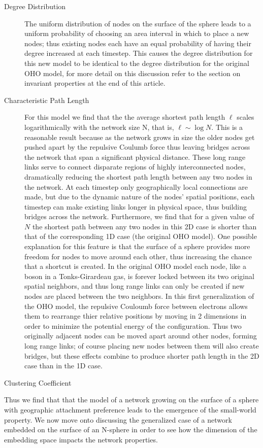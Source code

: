 \documentclass[aps,pre,reprint,superscriptaddress,amsmath,amssymb]{revtex4-1}
\begin{document}
\begin{description}
  \item[Degree Distribution] The uniform distribution of nodes on the surface of the sphere leads to a uniform probability of choosing an area interval in which to place a new nodes; thus existing nodes each have an equal probability of having their degree increased at each timestep.
This causes the degree distribution for this new model to be identical to the degree distribution for the original OHO model, for more detail on this discussion refer to the section on invariant properties at the end of this article.
  \item[Characteristic Path Length] For this model we find that the the average shortest path length $\ell$ scales logarithmically with the network size N, that is, $\ell \sim \log N$. 
This is a reasonable result because as the network grows in size the older nodes get pushed apart by the repulsive Coulumb force thus leaving bridges across the network that span a significant physical distance.
These long range links serve to connect disparate regions of highly interconnected nodes, dramatically reducing the shortest path length between any two nodes in the network.
At each timestep only geographically local connections are made, but due to the dynamic nature of the nodes' spatial positions, each timestep can make existing links longer in physical space, thus building bridges across the network.
Furthermore, we find that for a given value of $N$ the shortest path between any two nodes in this 2D case is shorter than that of the corresponding 1D case (the original OHO model).
One possible explanation for this feature is that the surface of a sphere provides more freedom for nodes to move around each other, thus increasing the chance that a shortcut is created.
In the original OHO model each node, like a boson in a Tonks-Girardeau gas, is forever locked between its two original spatial neighbors, and thus long range links can only be created if new nodes are placed between the two neighbors.
In this first generalization of the OHO model, the repulsive Couloumb force between electrons allows them to rearrange thier relative positions by moving in 2 dimensions in order to minimize the potential energy of the configuration.
Thus two originally adjacent nodes can be moved apart around other nodes, forming long range links; of course placing new nodes between them will also create bridges, but these effects combine to produce shorter path length in the 2D case than in the 1D case.
  \item[Clustering Coefficient] 
\end{description}
Thus we find that that the model of a network growing on the surface of a sphere with geographic attachment preference leads to the emergence of the small-world property.
We now move onto discussing the generalized case of a network embedded on the surface of an N-sphere in order to see how the dimension of the embedding space impacts the network properties.
\end{document}
